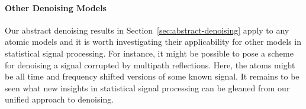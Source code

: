 \paragraph{Other Denoising Models} Our abstract denoising results in
Section~\ref{sec:abstract-denoising} apply to any atomic models and it is worth
investigating their applicability for other models in statistical signal
processing. For instance, it might be possible to pose a scheme for denoising a
signal corrupted by multipath reflections. Here, the atoms might be all time
and frequency shifted versions of some known signal. It remains to be seen what
new insights in statistical signal processing can be gleaned from our unified
approach to denoising.

